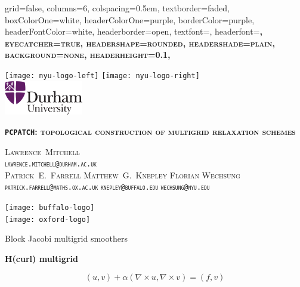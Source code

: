 \documentclass[paperwidth=60in,paperheight=36in,landscape]{baposter}
\begin{document}
\begin{poster}{
    grid=false,
    columns=6,
    colspacing=0.5em,
    textborder=faded,
    boxColorOne=white,
    headerColorOne=purple,
    borderColor=purple,
    headerFontColor=white,
    headerborder=open,
    textfont=\color{blue},
    headerfont=\bfseries\Large\scshape,
    eyecatcher=true,
    headershape=rounded,
    headershade=plain,
    background=none,
    headerheight=0.1\textheight,
  }
  {
    \begin{minipage}[c]{0.2\textwidth}
      {\raggedright
        \texttt{[image: nyu-logo-left]}
        \hskip10pt
        \texttt{[image: nyu-logo-right]}\\[0.5\baselineskip]

        \includegraphics[height=1.5cm]{durham-logo}
        \par
      }
    \end{minipage}
  } 
  {{\color{blue}\bfseries\scshape\fontsize{20}{22}\selectfont \texttt{PCPATCH}: topological construction of multigrid
      relaxation schemes\par}}
  {{\color{blue}\vspace{0.2em}\small\scshape Lawrence~Mitchell\\
      {\normalfont \texttt{lawrence.mitchell@durham.ac.uk}}
      \\[0.5em]
      {\footnotesize Patrick~E.~Farrell \quad Matthew~G.~Knepley \quad Florian
        Wechsung\\
        {\normalfont \texttt{patrick.farrell@maths.ox.ac.uk} \quad
          \texttt{knepley@buffalo.edu} \quad \texttt{wechsung@nyu.edu}}}}}
  {%
    \begin{minipage}[c]{0.2\textwidth}
      
      {\flushright
        \texttt{[image: buffalo-logo]}\\[0.5\baselineskip]

        \texttt{[image: oxford-logo]}
        \par}
    \end{minipage}
    
  }%
  \begin{posterbox}[name=introduction,span=2,column=0,row=0, height=1]{Block
      Jacobi multigrid smoothers}
    \vspace{0.25\baselineskip}
    {\centering\Large\bfseries H(curl) multigrid\strut\par}
    \vspace{-0.75\baselineskip}
    \begin{equation*}
      (u, v) + \alpha(\nabla \times u, \nabla \times v) = (f, v)
    \end{equation*}
    

\end{posterbox}
\end{poster}
\end{document}
